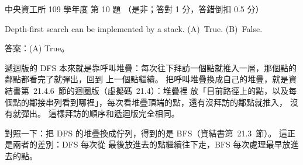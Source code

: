 \begin{pastexam}[label={px:ncu-109-dsa-10}]{中央資工所 109 學年度 第 10 題}
（是非；答對 1 分，答錯倒扣 0.5 分）

Depth-first search can be implemented by a stack. \qquad (A)~True. \qquad (B)~False.
\end{pastexam}

\begin{pastsoln}
答案：(A) True。

遞迴版的 DFS 本來就是靠呼叫堆疊：每次往下拜訪一個點就推入一層，那個點的鄰點都看完了就彈出，回到
上一個點繼續。 把呼叫堆疊換成自己的堆疊，就是資結書第~21.4.6~節的迴圈版（虛擬碼~21.4）：堆疊裡
放「目前路徑上的點，以及每個點的鄰接串列看到哪裡」，每次看堆疊頂端的點，還有沒拜訪的鄰點就推入，
沒有就彈出。 這樣拜訪的順序和遞迴版完全相同。

對照一下：把 DFS 的堆疊換成佇列，得到的是 BFS（資結書第~21.3~節）。 這正是兩者的差別：DFS 每次從
最後放進去的點繼續往下走，BFS 每次處理最早放進去的點。
\end{pastsoln}
